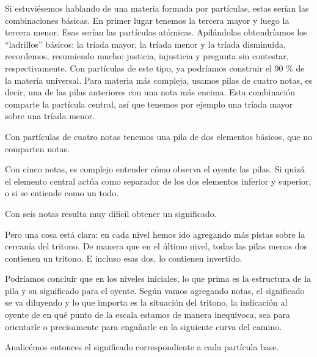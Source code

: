\documentclass[]{report}
\begin{document}
Si estuviésemos hablando de una materia formada por partículas, estas serían las combinaciones básicas. En primer lugar tenemos la tercera mayor y luego la tercera menor. Esas serían las partículas atómicas. Apilándolas obtendríamos los ``ladrillos'' básicos: la tríada mayor, la tríada menor y la tríada disminuida, recordemos, resumiendo mucho: justicia, injusticia y pregunta sin contestar, respectivamente. Con partículas de este tipo, ya podríamos construir el 90 \% de la materia universal. Para materia más compleja, usamos pilas de cuatro notas, es decir, una de las pilas anteriores con una nota más encima. Esta combinación comparte la partícula central, así que tenemos por ejemplo una tríada mayor sobre una tríada menor.

Con partículas de cuatro notas tenemos una pila de dos elementos básicos, que no comparten notas.

Con cinco notas, es complejo entender cómo observa el oyente las pilas. Si quizá el elemento central actúa como separador de los dos elementos inferior y superior, o si se entiende como un todo.

Con seis notas resulta muy dificil obtener un significado.

Pero una cosa está clara: en cada nivel hemos ido agregando más pistas sobre la cercanía del tritono. De manera que en el último nivel, todas las pilas menos dos contienen un tritono. E incluso esas dos, lo contienen invertido.

Podríamos concluir que en los niveles iniciales, lo que prima es la estructura de la pila y su significado para el oyente. Según vamos agregando notas, el significado se va diluyendo y lo que importa es la situación del tritono, la indicación al oyente de en qué punto de la escala estamos de manera inequívoca, sea para orientarle o precisamente para engañarle en la siguiente curva del camino.

Analicémos entonces el significado correspondiente a cada partícula base.

\end{document}
